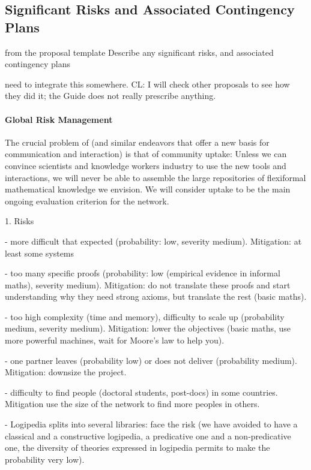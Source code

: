 \subsection{Significant Risks and Associated Contingency Plans}\label{sec:risks}

\begin{todo}{from the proposal template}
  Describe any significant risks, and associated contingency plans
\end{todo}
\begin{oldpart}{need to integrate this somewhere. CL: I will check other proposals to see how they did it; the Guide does not really prescribe anything.}
\paragraph{Global Risk Management}
The crucial problem of \pn (and similar endeavors that offer a new basis for communication
and interaction) is that of community uptake: Unless we can convince scientists and
knowledge workers industry to use the new tools and interactions, we will
never be able to assemble the large repositories of flexiformal mathematical knowledge we
envision. We will consider uptake to be the main ongoing evaluation criterion for the network.
\end{oldpart}



1. Risks

- more difficult that expected (probability: low, severity medium). Mitigation: at least some systems

- too many specific proofs (probability: low (empirical evidence in informal maths), severity medium). Mitigation: do not translate these proofs and start understanding why they need strong axioms, but translate the rest (basic maths).

- too high complexity (time and memory), difficulty to scale up (probability medium, severity medium). Mitigation: lower the objectives (basic maths, use more powerful machines, wait for Moore's law to help you).

- one partner leaves (probability low) or does not deliver (probability medium). Mitigation: downsize the project.

- difficulty to find people (doctoral students, post-docs) in some countries. Mitigation use the size of the network to find more peoples in others.

- Logipedia splits into several libraries: face the risk  (we have avoided to have a classical and a constructive logipedia, a predicative one and a non-predicative one, the diversity of theories expressed in logipedia permits to make the probability very low). 

